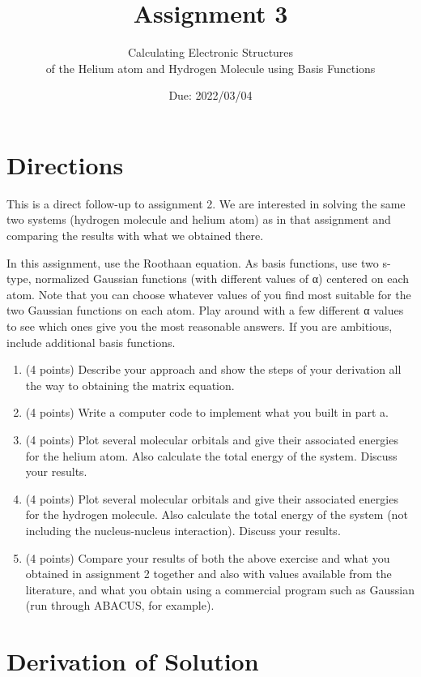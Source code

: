 \documentclass[10pt, oneside, letterpaper]{article}
\title{Assignment 3}
\author{Calculating Electronic Structures \\ of the Helium atom and Hydrogen Molecule using Basis Functions}
\date{Due: 2022/03/04}
\begin{document}
\maketitle
\thispagestyle{fancy}

\section{Directions}

This is a direct follow-up to assignment 2. We are interested in solving the same two systems (hydrogen molecule and helium atom) as in that assignment and comparing the results with what we obtained there.

In this assignment, use the Roothaan equation. As basis functions, use two s-type, normalized Gaussian functions (with different values of α) centered on each atom. Note that you can choose whatever values of \textalpha you find most suitable for the two Gaussian functions on each atom. Play around with a few different α values to see which ones give you the most reasonable answers. If you are ambitious, include additional basis functions.

\begin{enumerate}[label=(\alph*)]
  \item (4 points) Describe your approach and show the steps of your derivation all the way to obtaining the matrix equation.
  \item (4 points) Write a computer code to implement what you built in part a.
  \item (4 points) Plot several molecular orbitals and give their associated energies for the helium atom. Also calculate the total energy of the system. Discuss your results.
  \item (4 points) Plot several molecular orbitals and give their associated energies for the hydrogen molecule. Also calculate the total energy of the system (not including the nucleus-nucleus interaction). Discuss your results.
  \item (4 points) Compare your results of both the above exercise and what you obtained in assignment 2 together and also with values available from the literature, and what you obtain using a commercial program such as Gaussian (run through ABACUS, for example).
\end{enumerate}

\section{Derivation of Solution}
\end{document}
